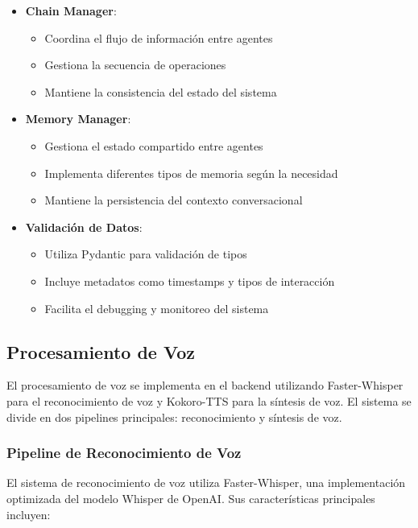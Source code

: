 \begin{itemize}
    \item \textbf{Chain Manager}:
    \begin{itemize}
        \item Coordina el flujo de información entre agentes
        \item Gestiona la secuencia de operaciones
        \item Mantiene la consistencia del estado del sistema
    \end{itemize}

    \item \textbf{Memory Manager}:
    \begin{itemize}
        \item Gestiona el estado compartido entre agentes
        \item Implementa diferentes tipos de memoria según la necesidad
        \item Mantiene la persistencia del contexto conversacional
    \end{itemize}

    \item \textbf{Validación de Datos}:
    \begin{itemize}
        \item Utiliza Pydantic para validación de tipos
        \item Incluye metadatos como timestamps y tipos de interacción
        \item Facilita el debugging y monitoreo del sistema
    \end{itemize}
\end{itemize}

\subsection{Procesamiento de Voz}
\label{implementacion-voz}

El procesamiento de voz se implementa en el backend utilizando Faster-Whisper para el reconocimiento de voz y Kokoro-TTS para la síntesis de voz. El sistema se divide en dos pipelines principales: reconocimiento y síntesis de voz.

\subsubsection{Pipeline de Reconocimiento de Voz}

El sistema de reconocimiento de voz utiliza Faster-Whisper, una implementación optimizada del modelo Whisper de OpenAI. Sus características principales incluyen:

